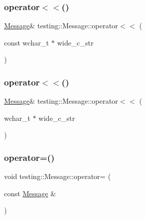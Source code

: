 \mbox{\label{classtesting_1_1_message_a34774e225944cb6df02db9689d312aae}} 
\subsubsection{\texorpdfstring{operator$<$$<$()}{operator<<()}\hspace{0.1cm}{\footnotesize\ttfamily [17/18]}}
{\footnotesize\ttfamily \mbox{\hyperlink{classtesting_1_1_message}{Message}}\& testing\+::\+Message\+::operator$<$$<$ (\begin{DoxyParamCaption}\item[{const wchar\+\_\+t $\ast$}]{wide\+\_\+c\+\_\+str }\end{DoxyParamCaption})}

\mbox{\label{classtesting_1_1_message_aae57eefb3a72a19c11453d630b1d846c}} 
\subsubsection{\texorpdfstring{operator$<$$<$()}{operator<<()}\hspace{0.1cm}{\footnotesize\ttfamily [18/18]}}
{\footnotesize\ttfamily \mbox{\hyperlink{classtesting_1_1_message}{Message}}\& testing\+::\+Message\+::operator$<$$<$ (\begin{DoxyParamCaption}\item[{wchar\+\_\+t $\ast$}]{wide\+\_\+c\+\_\+str }\end{DoxyParamCaption})}

\mbox{\label{classtesting_1_1_message_a5a0462b539ffb88f15ea0c67977774af}} 
\subsubsection{\texorpdfstring{operator=()}{operator=()}\hspace{0.1cm}{\footnotesize\ttfamily [1/3]}}
{\footnotesize\ttfamily void testing\+::\+Message\+::operator= (\begin{DoxyParamCaption}\item[{const \mbox{\hyperlink{classtesting_1_1_message}{Message}} \&}]{ }\end{DoxyParamCaption})\hspace{0.3cm}{\ttfamily [private]}}

